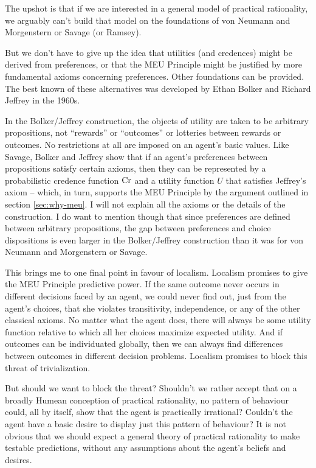 The upshot is that if we are interested in a general model of
practical rationality, we arguably can't build that model on the
foundations of von Neumann and Morgenstern or Savage (or Ramsey). 

But we don't have to give up the idea that utilities (and credences)
might be derived from preferences, or that the MEU Principle might be
justified by more fundamental axioms concerning preferences. Other
foundations can be provided. The best known of these alternatives was
developed by Ethan Bolker and Richard Jeffrey in the 1960s.

In the Bolker/Jeffrey construction, the objects of utility are taken
to be arbitrary propositions, not ``rewards'' or ``outcomes'' or
lotteries between rewards or outcomes. No restrictions at all are
imposed on an agent's basic values. Like Savage, Bolker and Jeffrey
show that if an agent's preferences between propositions satisfy
certain axioms, then they can be represented by a probabilistic
credence function $\text{Cr}$ and a utility function $U$ that satisfies
Jeffrey's axiom -- which, in turn, supports the MEU Principle by the
argument outlined in section \ref{sec:why-meu}. I will not explain all
the axioms or the details of the construction. I do want to mention
though that since preferences are defined between arbitrary
propositions, the gap between preferences and choice dispositions is
even larger in the Bolker/Jeffrey construction than it was for von
Neumann and Morgenstern or Savage. %

This brings me to one final point in favour of localism. Localism
promises to give the MEU Principle predictive power. If the same
outcome never occurs in different decisions faced by an agent, we
could never find out, just from the agent's choices, that she violates
transitivity, independence, or any of the other classical axioms. No
matter what the agent does, there will always be some utility function
relative to which all her choices maximize expected utility. And if
outcomes can be individuated globally, then we can always find
differences between outcomes in different decision problems. Localism
promises to block this threat of trivialization.

But should we want to block the threat? Shouldn't we rather accept that on
a broadly Humean conception of practical rationality, no pattern of
behaviour could, all by itself, show that the agent is practically
irrational? Couldn't the agent have a basic desire to display just
this pattern of behaviour? It is not obvious that we should expect a
general theory of practical rationality to make testable predictions,
without any assumptions about the agent's beliefs and desires.

